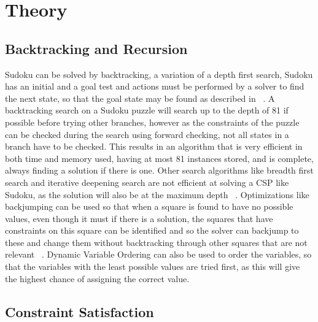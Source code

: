 \documentclass[]{final_report}
\begin{document}
\chapter*{Theory}

\section*{Backtracking and Recursion}

Sudoku can be solved by backtracking, a variation of a depth first search, Sudoku has an initial and a goal test and actions must be performed by a solver to find the next state, so that the goal state may be found as described in ~\cite{RUSSELL:2016}. A backtracking search on a Sudoku puzzle will search up to the depth of 81 if possible before trying other branches, however as the constraints of the puzzle can be checked during the search using forward checking, not all states in a branch have to be checked. This results in an algorithm that is very efficient in both time and memory used, having at most 81 instances stored, and is complete, always finding a solution if there is one. Other search algorithms like breadth first search and iterative deepening search are not efficient at solving a CSP like Sudoku, as the solution will also be at the maximum depth ~\cite{TSANG:1993}. Optimizations like backjumping can be used so that when a square is found to have no possible values, even though it must if there is a solution, the squares that have constraints on this square can be identified and so the solver can backjump to these and change them without backtracking through other squares that are not relevant ~\cite{TSANG:1993}. Dynamic Variable Ordering can also be used to order the variables, so that the variables with the least possible values are tried first, as this will give the highest chance of assigning the correct value.

\section*{Constraint Satisfaction}
\end{document}
